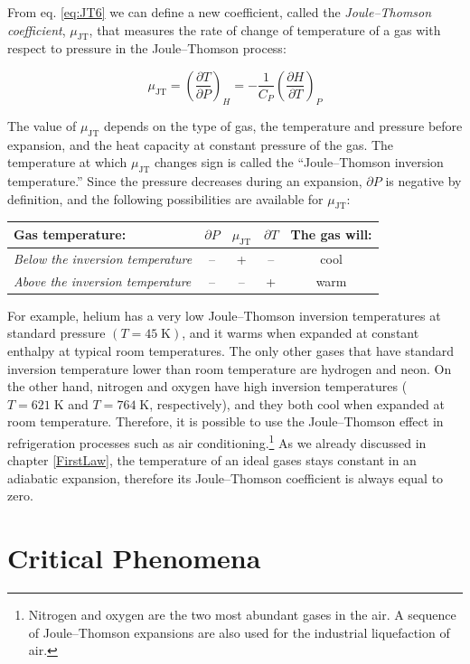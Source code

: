 \documentclass[
  9pt,
]{extbook}
\theoremstyle{definition}
\theoremstyle{definition}
\theoremstyle{definition}
\theoremstyle{remark}
\begin{document}
From eq. \eqref{eq:JT6} we can define a new coefficient, called the \emph{Joule--Thomson coefficient}, \(\mu_{\mathrm{JT}}\), that measures the rate of change of temperature of a gas with respect to pressure in the Joule--Thomson process:

\begin{equation}
\mu_{\mathrm{JT}}=\left( \frac{\partial T}{\partial P} \right)_H=-\frac{1}{C_P} \left( \frac{\partial H}{\partial T} \right)_P
\label{eq:muJT}
\end{equation}

The value of \(\mu_{\mathrm{JT}}\) depends on the type of gas, the temperature and pressure before expansion, and the heat capacity at constant pressure of the gas. The temperature at which \(\mu_{\mathrm{JT}}\) changes sign is called the ``Joule--Thomson inversion temperature.'' Since the pressure decreases during an expansion, \(\partial P\) is negative by definition, and the following possibilities are available for \(\mu_{\mathrm{JT}}\):

\begin{longtable}[]{@{}lcccc@{}}
\toprule
Gas temperature: & \(\partial P\) & \(\mu_{\mathrm{JT}}\) & \(\partial T\) & The gas will:\tabularnewline
\midrule
\endhead
\emph{Below the inversion temperature} & -- & + & -- & cool\tabularnewline
\emph{Above the inversion temperature} & -- & -- & + & warm\tabularnewline
\bottomrule
\end{longtable}

For example, helium has a very low Joule--Thomson inversion temperatures at standard pressure \((T=45\;\text{K})\), and it warms when expanded at constant enthalpy at typical room temperatures. The only other gases that have standard inversion temperature lower than room temperature are hydrogen and neon. On the other hand, nitrogen and oxygen have high inversion temperatures (\(T=621\;\text{K}\) and \(T=764\;\text{K}\), respectively), and they both cool when expanded at room temperature. Therefore, it is possible to use the Joule--Thomson effect in refrigeration processes such as air conditioning.\footnote{Nitrogen and oxygen are the two most abundant gases in the air. A sequence of Joule--Thomson expansions are also used for the industrial liquefaction of air.} As we already discussed in chapter \ref{FirstLaw}, the temperature of an ideal gases stays constant in an adiabatic expansion, therefore its Joule--Thomson coefficient is always equal to zero.

\hypertarget{critical-phenomena}{%
\section{Critical Phenomena}\label{critical-phenomena}}
\end{document}
